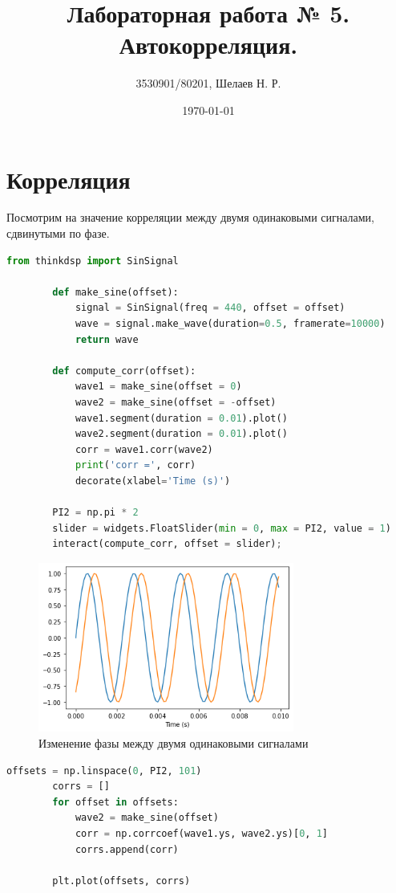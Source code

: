 \documentclass[a4paper, 12pt]{report}
\author{3530901/80201, Шелаев Н. Р.}
\title{Лабораторная работа № 5. Автокорреляция.}
\date{\today}
\begin{document}
	\maketitle
	\tableofcontents
	\listoffigures
	\lstlistoflistings

	\chapter{Корреляция}
	Посмотрим на значение корреляции между двумя одинаковыми сигналами, сдвинутыми по фазе.
	\begin{lstlisting}[language=Python,caption=Два сдвинутые по фазе сигнала]
		from thinkdsp import SinSignal

		def make_sine(offset):
			signal = SinSignal(freq = 440, offset = offset)
			wave = signal.make_wave(duration=0.5, framerate=10000)
			return wave
		
		def compute_corr(offset):
			wave1 = make_sine(offset = 0)
			wave2 = make_sine(offset = -offset)
			wave1.segment(duration = 0.01).plot()
			wave2.segment(duration = 0.01).plot()
			corr = wave1.corr(wave2)
			print('corr =', corr)
			decorate(xlabel='Time (s)')
		
		PI2 = np.pi * 2
		slider = widgets.FloatSlider(min = 0, max = PI2, value = 1)
		interact(compute_corr, offset = slider);
	\end{lstlisting}
	\begin{figure}[H]
		\centering
		\includegraphics[width=0.75\textwidth]{sin1.png}
		\caption{Изменение фазы между двумя одинаковыми сигналами}
		\label{fig:sin1}
	\end{figure}
	\begin{lstlisting}[language=Python,caption=Корреляция между сигналами в зависимости от фазы]
		offsets = np.linspace(0, PI2, 101)
		corrs = []
		for offset in offsets:
			wave2 = make_sine(offset)
			corr = np.corrcoef(wave1.ys, wave2.ys)[0, 1]
			corrs.append(corr)
	
		plt.plot(offsets, corrs)
	\end{lstlisting}
\end{document}
